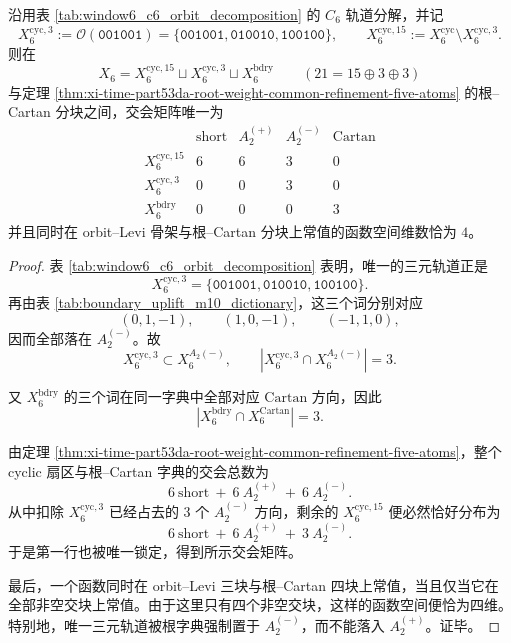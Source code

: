 \begin{theorem}\label{thm:xi-time-part53da-orbit-levi-root-cartan-intersection}
沿用表 \ref{tab:window6_c6_orbit_decomposition} 的 \(C_6\) 轨道分解，并记
\[
X_6^{\mathrm{cyc},3}:=\mathcal{O}(\texttt{001001})
=
\{\texttt{001001},\texttt{010010},\texttt{100100}\},
\qquad
X_6^{\mathrm{cyc},15}:=X_6^{\mathrm{cyc}}\setminus X_6^{\mathrm{cyc},3}.
\]
则在
\[
X_6=X_6^{\mathrm{cyc},15}\sqcup X_6^{\mathrm{cyc},3}\sqcup X_6^{\mathrm{bdry}}
\qquad (21=15\oplus 3\oplus 3)
\]
与定理 \ref{thm:xi-time-part53da-root-weight-common-refinement-five-atoms} 的根--Cartan 分块之间，交会矩阵唯一为
\[
\begin{array}{c|cccc}
& \mathrm{short} & A_2^{(+)} & A_2^{(-)} & \mathrm{Cartan}\\
\hline
X_6^{\mathrm{cyc},15} & 6 & 6 & 3 & 0\\
X_6^{\mathrm{cyc},3}  & 0 & 0 & 3 & 0\\
X_6^{\mathrm{bdry}}   & 0 & 0 & 0 & 3
\end{array}
\]
并且同时在 orbit--Levi 骨架与根--Cartan 分块上常值的函数空间维数恰为 \(4\)。
\end{theorem}
\begin{proof}
表 \ref{tab:window6_c6_orbit_decomposition} 表明，唯一的三元轨道正是
\[
X_6^{\mathrm{cyc},3}
=
\{\texttt{001001},\texttt{010010},\texttt{100100}\}.
\]
再由表 \ref{tab:boundary_uplift_m10_dictionary}，这三个词分别对应
\[
(0,1,-1),\qquad (1,0,-1),\qquad (-1,1,0),
\]
因而全部落在 \(A_2^{(-)}\)。故
\[
X_6^{\mathrm{cyc},3}\subset X_6^{A_2(-)},
\qquad
|X_6^{\mathrm{cyc},3}\cap X_6^{A_2(-)}|=3.
\]

又 \(X_6^{\mathrm{bdry}}\) 的三个词在同一字典中全部对应 \(\mathrm{Cartan}\) 方向，因此
\[
|X_6^{\mathrm{bdry}}\cap X_6^{\mathrm{Cartan}}|=3.
\]

由定理 \ref{thm:xi-time-part53da-root-weight-common-refinement-five-atoms}，整个 cyclic 扇区与根--Cartan 字典的交会总数为
\[
6\ \mathrm{short}\ +\ 6\ A_2^{(+)}\ +\ 6\ A_2^{(-)}.
\]
从中扣除 \(X_6^{\mathrm{cyc},3}\) 已经占去的 \(3\) 个 \(A_2^{(-)}\) 方向，剩余的 \(X_6^{\mathrm{cyc},15}\) 便必然恰好分布为
\[
6\ \mathrm{short}\ +\ 6\ A_2^{(+)}\ +\ 3\ A_2^{(-)}.
\]
于是第一行也被唯一锁定，得到所示交会矩阵。

最后，一个函数同时在 orbit--Levi 三块与根--Cartan 四块上常值，当且仅当它在全部非空交块上常值。由于这里只有四个非空交块，这样的函数空间便恰为四维。特别地，唯一三元轨道被根字典强制置于 \(A_2^{(-)}\)，而不能落入 \(A_2^{(+)}\)。证毕。
\end{proof}

